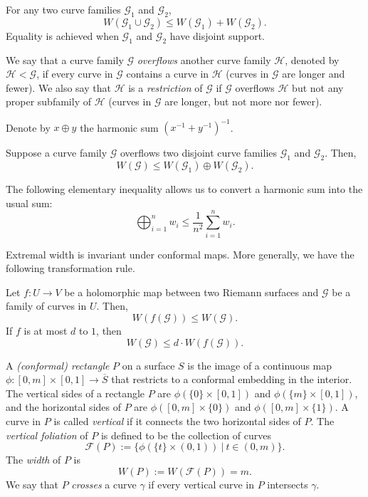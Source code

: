 \documentclass{amsart}
\begin{document}
\begin{proposition}
    \label{prop:parallel-law}
    For any two curve families $\mathcal{G}_1$ and $\mathcal{G}_2$,
    \[
    W(\mathcal{G}_1 \cup \mathcal{G}_2) \leq W(\mathcal{G}_1) + W(\mathcal{G}_2).
    \]
    Equality is achieved when $\mathcal{G}_1$ and $\mathcal{G}_2$ have disjoint support.
\end{proposition}

We say that a curve family $\mathcal{G}$ \emph{overflows} another curve family $\mathcal{H}$, denoted by $\mathcal{H} < \mathcal{G}$, if every curve in $\mathcal{G}$ contains a curve in $\mathcal{H}$ (curves in $\mathcal{G}$ are longer and fewer). We also say that $\mathcal{H}$ is a \emph{restriction} of $\mathcal{G}$ if $\mathcal{G}$ overflows $\mathcal{H}$ but not any proper subfamily of $\mathcal{H}$ (curves in $\mathcal{G}$ are longer, but not more nor fewer).

Denote by $x \oplus y$ the harmonic sum $(x^{-1}+y^{-1})^{-1}$.

\begin{proposition}
    \label{prop:series-law}
    Suppose a curve family $\mathcal{G}$ overflows two disjoint curve families $\mathcal{G}_1$ and $\mathcal{G}_2$. Then,
    \[
    W(\mathcal{G}) \leq W(\mathcal{G}_1) \oplus W(\mathcal{G}_2).
    \]
\end{proposition}

The following elementary inequality allows us to convert a harmonic sum into the usual sum:
\[
    \bigoplus_{i=1}^n w_i \leq \frac{1}{n^2} \sum_{i=1}^n w_i.
\]

Extremal width is invariant under conformal maps. More generally, we have the following transformation rule.

\begin{proposition}
    \label{prop:transformation-law}
    Let $f: U\to V$ be a holomorphic map between two Riemann surfaces and $\mathcal{G}$ be a family of curves in $U$. Then,
    \[
    W(f(\mathcal{G})) \leq W(\mathcal{G}).
    \]
    If $f$ is at most $d$ to $1$, then
    \[
    W(\mathcal{G}) \leq d \cdot W(f(\mathcal{G})).
    \]
\end{proposition}

A \emph{(conformal) rectangle} $P$ on a surface $S$ is the image of a continuous map $\phi: [0,m]\times[0,1] \to \overline{S}$ that restricts to a conformal embedding in the interior. 
The vertical sides of a rectangle $P$ are $\phi(\{0\}\times [0,1])$ and $\phi(\{m\} \times [0,1])$, and the horizontal sides of $P$ are $\phi([0,m]\times \{0\})$ and $\phi([0,m]\times\{1\})$. 
A curve in $P$ is called \emph{vertical} if it connects the two horizontal sides of $P$. The \emph{vertical foliation} of $P$ is defined to be the collection of curves
\[
\mathcal{F}(P) := \{ \phi\left( \{t\} \times (0,1) \right) \: | \: t \in (0,m)\}.
\]
The \emph{width} of $P$ is 
\[
W(P) := W(\mathcal{F}(P))= m.
\]
We say that $P$ \emph{crosses} a curve $\gamma$ if every vertical curve in $P$ intersects $\gamma$.
\end{document}

